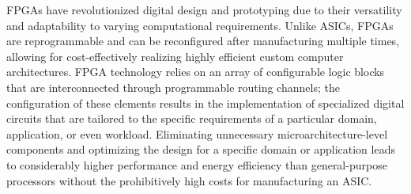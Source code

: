 FPGAs have revolutionized digital design and prototyping due to their versatility and adaptability to varying computational requirements. Unlike ASICs, FPGAs are reprogrammable and can be reconfigured after manufacturing multiple times, allowing for cost-effectively realizing highly efficient custom computer architectures. FPGA technology relies on an array of configurable logic blocks that are interconnected through programmable routing channels; the configuration of these elements results in the implementation of specialized digital circuits that are tailored to the specific requirements of a particular domain, application, or even workload. Eliminating unnecessary microarchitecture-level components and optimizing the design for a specific domain or application leads to considerably higher performance and energy efficiency than general-purpose processors without the prohibitively high costs for manufacturing an ASIC.


